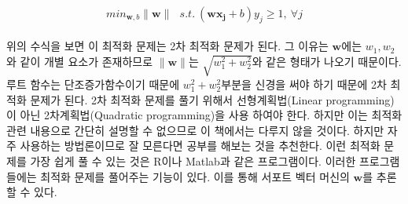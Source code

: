 \documentclass[a4paper]{oblivoir}
\begin{document}
\begin{equation}
min_{\mathbf{w},b} {\lVert \mathbf{w}\rVert}\ \ \ s.t.\ (\mathbf{wx_j}+b)y_j\geq 1,\ \forall j
\label{eq:5-13}
\end{equation}\\
\indent 위의 수식을 보면 이 최적화 문제는 2차 최적화 문제가 된다. 그 이유는 $\mathbf{w}$에는 $w_1,w_2$와 같이 개별 요소가 존재하므로 $\lVert \mathbf{w}\rVert$는 $\sqrt{w_1^2+w_2^2}$와 같은 형태가 나오기 때문이다. 루트 함수는 단조증가함수이기 때문에 $w_1^2+w_2^2$부분을 신경을 써야 하기 때문에 2차 최적화 문제가 된다. 2차 최적화 문제를 풀기 위해서 선형계획법(Linear programming)이 아닌 2차계획법(Quadratic programming)을 사용 하여야 한다. 하지만 이는 최적화 관련 내용으로 간단히 설명할 수 없으므로 이 책에서는 다루지 않을 것이다. 하지만 자주 사용하는 방법론이므로 잘 모른다면 공부를 해보는 것을 추천한다. 이런 최적화 문제를 가장 쉽게 풀 수 있는 것은 R이나 Matlab과 같은 프로그램이다. 이러한 프로그램들에는 최적화 문제를 풀어주는 기능이 있다. 이를 통해 서포트 벡터 머신의 $\mathbf{w}$를 추론할 수 있다.\\

\end{document}
